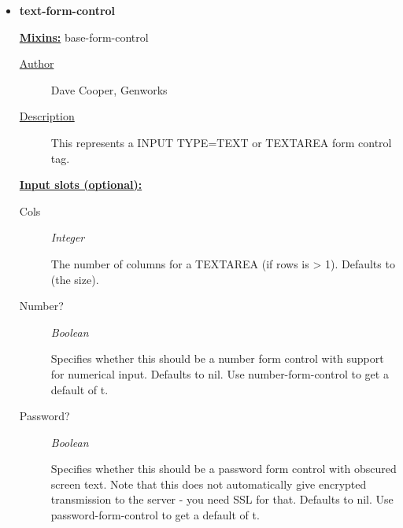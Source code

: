 \documentclass [11pt]{book}
\begin{document}
\begin{itemize}
\begin{description}
\end{description}







\item {}
\label{prim:text-form-control}
\textbf{text-form-control}


\textbf{
\underline{Mixins:}} base-form-control





\begin{description}

\item [
\underline{Author}]


Dave Cooper, Genworks



\item [
\underline{Description}]


This represents a INPUT TYPE=TEXT or TEXTAREA form control tag.



\end{description}








\textbf{
\underline{Input slots (optional):}}

\begin{description}

\item [Cols]
\emph{Integer}

 The number of columns for a TEXTAREA (if rows is > 1). Defaults to (the size).




\item [Number?]
\emph{Boolean}

 Specifies whether this should be a number form control with support for numerical input.
Defaults to nil. Use number-form-control to get a default of t.




\item [Password?]
\emph{Boolean}

 Specifies whether this should be a password form control with obscured screen text.
Note that this does not automatically give encrypted transmission to the server - you need SSL
for that. Defaults to nil. Use password-form-control to get a default of t.





\end{description}
\end{itemize}
\end{document}
